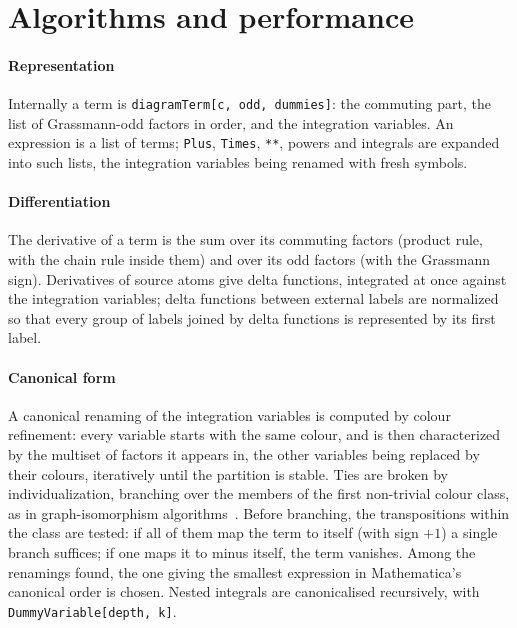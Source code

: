 \documentclass[11pt,a4paper]{article}
\newcommand{\pkg}[1]{\texttt{#1}}
\begin{document}
\section{Algorithms and performance}\label{sec:algorithms}

\paragraph{Representation} Internally a term is \pkg{diagramTerm[c, odd, dummies]}: the commuting part, the list of
Grassmann-odd factors in order, and the integration variables. An expression is a list of terms; \pkg{Plus},
\pkg{Times}, \pkg{**}, powers and integrals are expanded into such lists, the integration variables being renamed with
fresh symbols.

\paragraph{Differentiation} The derivative of a term is the sum over its commuting factors (product rule, with the chain
rule inside them) and over its odd factors (with the Grassmann sign). Derivatives of source atoms give delta functions,
integrated at once against the integration variables; delta functions between external labels are normalized so that
every group of labels joined by delta functions is represented by its first label.

\paragraph{Canonical form} A canonical renaming of the integration variables is computed by colour refinement: every
variable starts with the same colour, and is then characterized by the multiset of factors it appears in, the other
variables being replaced by their colours, iteratively until the partition is stable. Ties are broken by
individualization, branching over the members of the first non-trivial colour class, as in graph-isomorphism
algorithms~\cite{McKayPiperno2014}.
Before branching, the transpositions within the class are tested: if all of them map the term to itself (with sign
$+1$) a single branch suffices; if one maps it to minus itself, the term vanishes. Among the renamings found, the one
giving the smallest expression in Mathematica's canonical order is chosen. Nested integrals are canonicalised
recursively, with \pkg{DummyVariable[depth, k]}.
\end{document}
